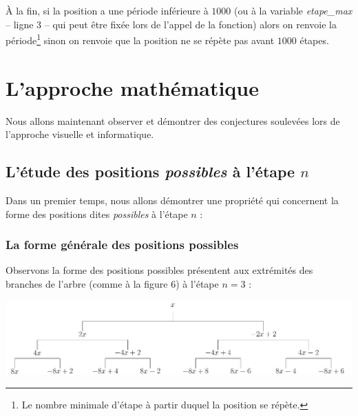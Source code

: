 \documentclass[a4paper,french,12pt]{article}
\begin{document}
À la fin, si la position a une période inférieure à $1000$ (ou à la variable \emph{etape\_max} -- ligne $3$ -- qui peut être fixée lors de l'appel de la fonction) alors on renvoie la période\footnote{Le nombre minimale d'étape à partir duquel la position se répète.} sinon on renvoie que la position ne se répète pas avant $1000$ étapes.

\hypertarget{2}{}


\section{L'approche mathématique}

Nous allons maintenant observer et démontrer des conjectures soulevées lors de l'approche visuelle et informatique.


\subsection{L'étude des positions \emph{possibles} à l'étape $n$}

Dans un premier temps, nous allons démontrer une propriété qui concernent la forme des positions dites \emph{possibles} à l'étape $n$ :



\subsubsection{La forme générale des positions possibles}

Observons la forme des positions possibles présentent aux extrémités des branches de l'arbre (comme à la figure $6$) à l'étape $n=3$ :

\vspace*{-0.5cm}

\begin{center}
\includegraphics[scale=0.45]{../TeXGraph/Pdf/visuel_2D_arbre_3.pdf}
\end{center}
\end{document}
